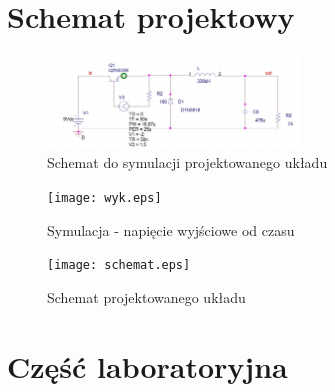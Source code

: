 \documentclass[a4paper,12pt]{article}
\begin{document}
\section {Schemat projektowy}
\begin{figure}[h] 
  \center
  \includegraphics[width=0.6\textwidth]{schemat_sim.eps}
  \caption{Schemat do symulacji projektowanego układu}
\end{figure}
\begin{figure}[h]
  \center
  \texttt{[image: wyk.eps]}
  \caption{Symulacja - napięcie wyjściowe od czasu}
\end{figure}
\begin{figure}[h]
  \center
  \texttt{[image: schemat.eps]}
  \caption{Schemat projektowanego układu}
\end{figure}
\pagebreak
\section{Część laboratoryjna}
\end{document}
